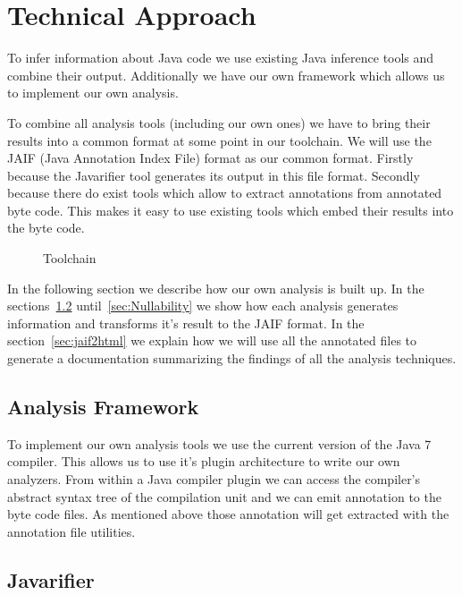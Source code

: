 \section{Technical Approach}
To infer information about Java code we use existing Java inference tools and 
combine their output. Additionally we have our own framework which allows us to
implement our own analysis. 

To combine all analysis tools (including our own ones) we have to bring 
their results into a common format at some point in our toolchain. 
We will use the JAIF (Java Annotation Index File) format as our common format. 
Firstly because the Javarifier tool generates its output in this file format. 
Secondly because there do exist tools which allow to extract annotations from 
annotated byte code. This makes it easy to use existing tools which embed their 
results into the byte code.

\begin{figure}
\centering
{}
\caption{Toolchain}
\label{fig:toolchain}
\end{figure}

In the following section we describe how our own analysis is built up.
In the sections~\ref{sec:Javarifier} until~\ref{sec:Nullability} we show how each analysis 
generates information and transforms it's result to the JAIF format. In the section~\ref{sec:jaif2html}
we explain how we will use all the annotated files to generate a documentation summarizing
the findings of all the analysis techniques.

\subsection{Analysis Framework}
\label{ss:analysisFramework}

To implement our own analysis tools we use the current version of the Java 7 compiler.
This allows us to use it's plugin architecture to write our own analyzers. From within
a Java compiler plugin we can access the compiler's abstract syntax tree of the 
compilation unit and we can emit 
annotation to the byte code files. As mentioned above those annotation will get extracted 
with the annotation file utilities.

\subsection{Javarifier}
\label{sec:Javarifier}

